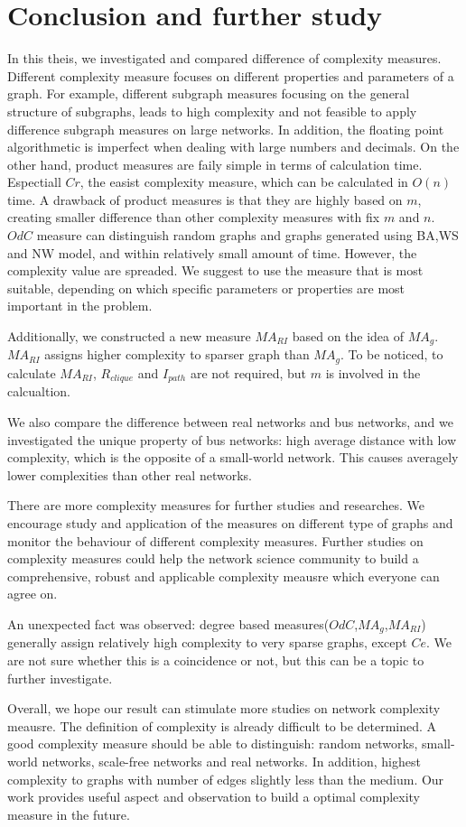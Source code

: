\documentclass[12pt]{article}
\begin{document}
\section{Conclusion and further study}
In this theis, we investigated and compared difference of complexity measures. Different complexity measure focuses on different properties and parameters of a graph. For example, different subgraph measures focusing on the general structure of subgraphs, leads to high complexity and not feasible to apply difference subgraph measures on large networks. In addition, the floating point algorithmetic is imperfect when dealing with large numbers and decimals.
On the other hand, product measures are faily simple in terms of calculation time. Espectiall $Cr$, the easist complexity measure, which can be calculated in $O(n)$ time\cite{KIM20082637}. A drawback of product measures is that they are highly based on $m$, creating smaller difference than other complexity measures with fix $m$ and $n$.
$OdC$ measure can distinguish random graphs and graphs generated using BA,WS and NW model, and within relatively small amount of time. However, the complexity value are spreaded. We suggest to use the measure that is most suitable, depending on which specific parameters or properties are most important in the problem.\par
Additionally, we constructed a new measure $MA_{RI}$ based on the idea of $MA_g$. $MA_{RI}$ assigns higher complexity to sparser graph than $MA_g$. To be noticed, to calculate $MA_{RI}$, $R_{clique}$ and $I_{path}$ are not required, but $m$ is involved in the calcualtion.\par
We also compare the difference between real networks and bus networks, and we investigated the unique property of bus networks: high average distance with low complexity, which is the opposite of a small-world network. This causes averagely lower complexities than other real networks.\par
There are more complexity measures \cite{emmert-streib_dehmer_2012}\cite{dehmer_barbarini_varmuza_graber_2009} for further studies and researches. We encourage study and application of the measures on different type of graphs and monitor the behaviour of different complexity measures. Further studies on complexity measures could help the network science community to build a comprehensive, robust and applicable complexity meausre which everyone can agree on.\par
An unexpected fact was observed: degree based measures($OdC$,$MA_g$,$MA_{RI}$) generally assign relatively high complexity to very sparse graphs, except $Ce$. We are not sure whether this is a coincidence or not, but this can be a topic to further investigate.\par
Overall, we hope our result can stimulate more studies on network complexity meausre. The definition of complexity is already difficult to be determined. A good complexity measure should be able to distinguish: random networks, small-world networks, scale-free networks and real networks. In addition, highest complexity to graphs with number of edges slightly less than the medium. Our work provides useful aspect and observation to build a optimal complexity measure in the future.
\end{document}
